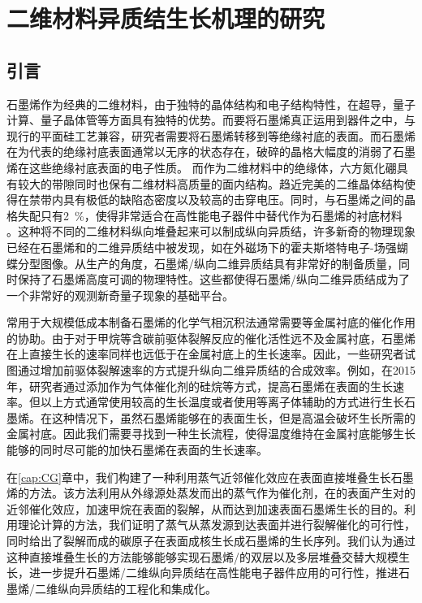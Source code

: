 \chapter{二维材料异质结生长机理的研究}
\section{引言}
石墨烯作为经典的二维材料，由于独特的晶体结构和电子结构特性，在超导，量子计算、量子晶体管等方面具有独特的优势。而要将石墨烯真正运用到器件之中，与现行的平面硅工艺兼容，研究者需要将石墨烯转移到等绝缘衬底的表面。而石墨烯在为代表的绝缘衬底表面通常以无序的状态存在，破碎的晶格大幅度的消弱了石墨烯在这些绝缘衬底表面的电子性质。
而作为二维材料中的绝缘体，六方氮化硼具有较大的带隙同时也保有二维材料高质量的面内结构。趋近完美的二维晶体结构使得在禁带内具有极低的缺陷态密度以及较高的击穿电压。同时，与石墨烯之间的晶格失配只有\SI{2}{\percent}，使得非常适合在高性能电子器件中替代作为石墨烯的衬底材料 。这种将不同的二维材料纵向堆叠起来可以制成纵向异质结，许多新奇的物理现象已经在石墨烯和的二维异质结中被发现，如在外磁场下的霍夫斯塔特电子-场强蝴蝶分型图像。从生产的角度，石墨烯/纵向二维异质结具有非常好的制备质量，同时保持了石墨烯高度可调的物理特性。这些都使得石墨烯/纵向二维异质结成为了一个非常好的观测新奇量子现象的基础平台。

常用于大规模低成本制备石墨烯的化学气相沉积法通常需要等金属衬底的催化作用的协助。由于对于甲烷等含碳前驱体裂解反应的催化活性远不及金属衬底，石墨烯在上直接生长的速率同样也远低于在金属衬底上的生长速率。因此，一些研究者试图通过增加前驱体裂解速率的方式提升纵向二维异质结的合成效率。例如，在2015年，研究者通过添加作为气体催化剂的硅烷等方式，提高石墨烯在表面的生长速率。但以上方式通常使用较高的生长温度或者使用等离子体辅助的方式进行生长石墨烯。在这种情况下，虽然石墨烯能够在的表面生长，但是高温会破坏生长所需的金属衬底。因此我们需要寻找到一种生长流程，使得温度维持在金属衬底能够生长能够的同时尽可能的加快石墨烯在表面的生长速率。

在\ref{cap:CG}章中，我们构建了一种利用蒸气近邻催化效应在表面直接堆叠生长石墨烯的方法。该方法利用从外缘源处蒸发而出的蒸气作为催化剂，在的表面产生对的近邻催化效应，加速甲烷在表面的裂解，从而达到加速表面石墨烯生长的目的。利用理论计算的方法，我们证明了蒸气从蒸发源到达表面并进行裂解催化的可行性，同时给出了裂解而成的碳原子在表面成核生长成石墨烯的生长序列。我们认为通过这种直接堆叠生长的方法能够能够实现石墨烯/的双层以及多层堆叠交替大规模生长，进一步提升石墨烯/二维纵向异质结在高性能电子器件应用的可行性，推进石墨烯/二维纵向异质结的工程化和集成化。

